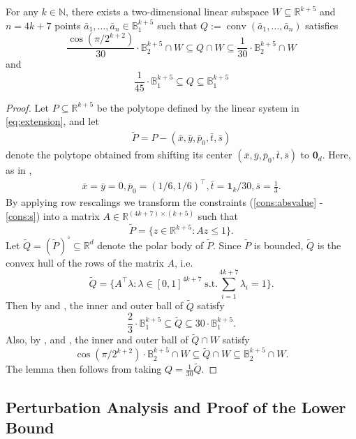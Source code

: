 \documentclass{article}\usepackage[a4paper,margin=20mm]{geometry}
\newcommand{\R}{\mathbb R}
\newcommand{\N}{\mathbb N}
\newcommand{\conv}{\operatorname{conv}}
\newcommand{\ball}{\mathbb{B}_2}
\renewcommand{\subset}{\subseteq}
\begin{document}
\begin{lemma}\label{lem:lb-prim-to-dual}
For any $k \in \N$, there exists a two-dimensional linear subspace $W \subset \R^{k+5}$ and $n = 4k+7$ points $\bar a_1,\ldots,\bar a_n \in \mathbb{B}_1^{k+5}$ such that $Q := \conv(\bar a_1,\ldots,\bar a_n)$ satisfies
\[
\frac{\cos(\pi/2^{k+2})}{30} \cdot \ball^{k+5} \cap W \subset Q \cap W \subset \frac{1}{30}\cdot \ball^{k+5}\cap W
\]
and
\[
    \frac{1}{45} \cdot \mathbb{B}_1^{k+5} \subset Q \subset \mathbb{B}_1^{k+5}
\]
\end{lemma}
\begin{proof}
Let $P \subset \R^{k+5}$ be the polytope defined by the linear system in \eqref{eq:extension}, and let 
\begin{align*}
    \tilde{P} = P - (\bar x, \bar y, \bar{p}_0, \bar t, \bar{s})
\end{align*}
denote the polytope obtained from shifting its center $(\bar x, \bar y, \bar{p}_0, \bar t, \bar{s})$ to $\mathbf{0}_d$.
Here, as in ,
\begin{align*}
    \bar x = \bar y = 0, \bar{p}_0 = (1/6,1/6)^\top, \bar t  = \mathbf{1}_{k}/30, \bar{s} = \frac{1}{3}.
\end{align*}
By applying row rescalings we transform the constraints
(\ref{cons:absvalue} - \ref{cons:s})
into a matrix $A \in \R^{(4k+7)\times(k+5)}$
such that
\[
\tilde{P} = \{z \in \R^{k+5} : Az \leq 1\}.
\]
Let $\tilde{Q} = (\tilde{P})^\circ \subset \R^d$ denote the polar body of $\tilde{P}$.
Since $\tilde{P}$ is bounded, $\tilde{Q}$ is the convex hull of the rows of the matrix $A$, i.e.
\[
\tilde{Q} = \{A^\top\lambda : \lambda \in [0,1]^{4k+7}\; \mbox{s.t.} \sum_{i=1}^{4k+7} \lambda_i = 1\}.
\]
Then by  and , the inner and outer ball of $\tilde{Q}$ satisfy
\[
    \frac{2}{3}\cdot \mathbb{B}_1^{k+5} \subset \tilde{Q} \subset 30\cdot \mathbb{B}_1^{k+5}.
\]
Also, by ,  and , the inner and outer ball of $\tilde{Q} \cap W$ satisfy
\[
\cos(\pi/2^{k+2}) \cdot \ball^{k+5}\cap W \subset \tilde{Q} \cap W \subset \ball^{k+5} \cap W.
\]
The lemma then follows from taking $Q = \frac{1}{30}\tilde{Q}$.
\end{proof}



\subsection{Perturbation Analysis and Proof of the Lower Bound}\label{sec:lb-perturbation}
\end{document}
